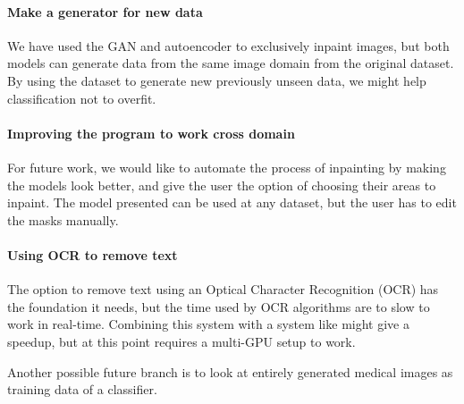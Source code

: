 \paragraph{Make a generator for new data}
We have used the GAN and autoencoder to exclusively inpaint images, but both models can generate data from the same image domain from the original dataset.
By using the dataset to generate new previously unseen data, we might help classification not to overfit.



\paragraph{Improving the program to work cross domain}
For future work, we would like to automate the process of inpainting by making the models look better, and give the user the option of choosing their areas to inpaint. The model presented can be used at any dataset, but the user has to edit the masks manually. 

\paragraph{Using OCR to remove text}
The option to remove text using an Optical Character Recognition (OCR) has the foundation it needs, but the time used by OCR algorithms are to slow to work in real-time. 
Combining this system with a system like  might give a speedup, but at this point requires a multi-GPU setup to work.

Another possible future branch is to look at entirely generated medical images as training data of a classifier. 